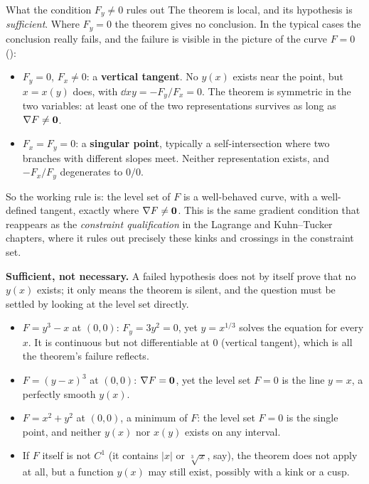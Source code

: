 \begin{rulebox}{What the condition $F_{y}\neq0$ rules out}
The theorem is local, and its hypothesis is \emph{sufficient}. Where
$F_{y}=0$ the theorem gives no conclusion. In the typical cases the
conclusion really fails, and the failure is visible in the picture of the
curve $F=0$ ():
\begin{itemize}[leftmargin=1.6em,itemsep=0.3ex]
  \item $F_{y}=0$, $F_{x}\neq0$: a \textbf{vertical tangent}. No $y(x)$
        exists near the point, but $x=x(y)$ does, with
        $\dd{x}{y}=-F_{y}/F_{x}=0$. The theorem is symmetric in the two
        variables: at least one of the two representations survives as long
        as $\nabla F\neq\mathbf{0}$.
  \item $F_{x}=F_{y}=0$: a \textbf{singular point}, typically a
        self-intersection where two branches with different slopes meet.
        Neither representation exists, and $-F_{x}/F_{y}$ degenerates to
        $0/0$.
\end{itemize}
So the working rule is: the level set of $F$ is a well-behaved curve, with a
well-defined tangent, exactly where $\nabla F\neq\mathbf{0}$. This is the
same gradient condition that reappears as the \emph{constraint
qualification} in the Lagrange and Kuhn--Tucker chapters, where it rules out
precisely these kinks and crossings in the constraint set.

\textbf{Sufficient, not necessary.} A failed hypothesis does not by itself
prove that no $y(x)$ exists; it only means the theorem is silent, and the
question must be settled by looking at the level set directly.
\begin{itemize}[leftmargin=1.6em,itemsep=0.3ex]
  \item $F=y^{3}-x$ at $(0,0)$: $F_{y}=3y^{2}=0$, yet $y=x^{1/3}$ solves
        the equation for every $x$. It is continuous but not differentiable
        at $0$ (vertical tangent), which is all the theorem's failure
        reflects.
  \item $F=(y-x)^{3}$ at $(0,0)$: $\nabla F=\mathbf{0}$, yet the level set
        $F=0$ is the line $y=x$, a perfectly smooth $y(x)$.
  \item $F=x^{2}+y^{2}$ at $(0,0)$, a minimum of $F$: the level set $F=0$ is
        the single point, and neither $y(x)$ nor $x(y)$ exists on any
        interval.
  \item If $F$ itself is not $C^{1}$ (it contains $|x|$ or $\sqrt[3]{x}$,
        say), the theorem does not apply at all, but a function $y(x)$ may
        still exist, possibly with a kink or a cusp.
\end{itemize}
\end{rulebox}

